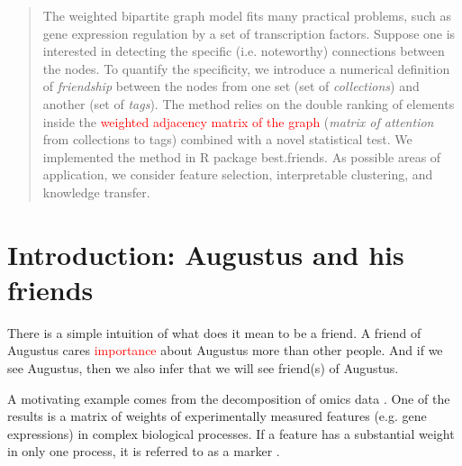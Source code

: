 \documentclass{llncs}
\begin{document}
\begin{abstract}
The weighted bipartite graph model fits many practical problems, such as gene expression regulation by a set of transcription factors. %
Suppose one is interested in detecting the specific (i.e. noteworthy) connections between the nodes. To quantify the specificity, we introduce a numerical definition of \textit{friendship} between the nodes from one set (set of \textit{collections}) and another (set of \textit{tags}). 
The method relies on the double ranking of elements inside the \textcolor{red}{weighted adjacency matrix of the graph} (\textit{matrix of attention} from collections to tags) combined with a novel statistical test. 
We implemented the method in \textsf{R} package \textsf{best.friends}.
As possible areas of application, we consider feature selection, interpretable clustering, and knowledge transfer. 
\end{abstract}


\section{Introduction: Augustus and his friends}

There is a simple intuition of what does it mean to be a friend. A friend of Augustus cares \textcolor{red}{importance} about Augustus more than other people. And if we see Augustus, then we also infer that we will see friend(s) of Augustus. 




A motivating example comes from the decomposition of omics data 
\cite{fertig_cogaps_2010, stein-obrien_enter_2018}. One of the results is a matrix of weights of experimentally measured features (e.g. gene expressions) in complex biological processes. If a feature has a substantial weight in only one process, it is referred to as a marker \cite{stein-obrien_patternmarkers_2017}. 
\end{document}
